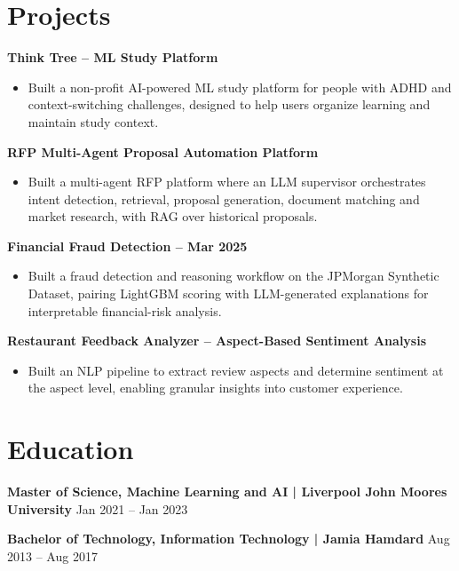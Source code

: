 \documentclass[10pt,a4paper]{article}
\begin{document}
\section{Projects}
\textbf{Think Tree -- ML Study Platform}\par
\begin{itemize}
  \item Built a non-profit AI-powered ML study platform for people with ADHD and context-switching challenges, designed
  to help users organize learning and maintain study context.
\end{itemize}
\textbf{RFP Multi-Agent Proposal Automation Platform}\par
\begin{itemize}
  \item Built a multi-agent RFP platform where an LLM supervisor orchestrates intent detection, retrieval, proposal
  generation, document matching and market research, with RAG over historical proposals.
\end{itemize}
\textbf{Financial Fraud Detection -- Mar 2025}\par
\begin{itemize}
  \item Built a fraud detection and reasoning workflow on the JPMorgan Synthetic Dataset, pairing LightGBM scoring
  with LLM-generated explanations for interpretable financial-risk analysis.
\end{itemize}
\textbf{Restaurant Feedback Analyzer -- Aspect-Based Sentiment Analysis}\par
\begin{itemize}
  \item Built an NLP pipeline to extract review aspects and determine sentiment at the aspect level, enabling
  granular insights into customer experience.
\end{itemize}

\section{Education}
\textbf{Master of Science, Machine Learning and AI | Liverpool John Moores University} \hfill Jan 2021 -- Jan 2023\par
\textbf{Bachelor of Technology, Information Technology | Jamia Hamdard} \hfill Aug 2013 -- Aug 2017\par
\end{document}
